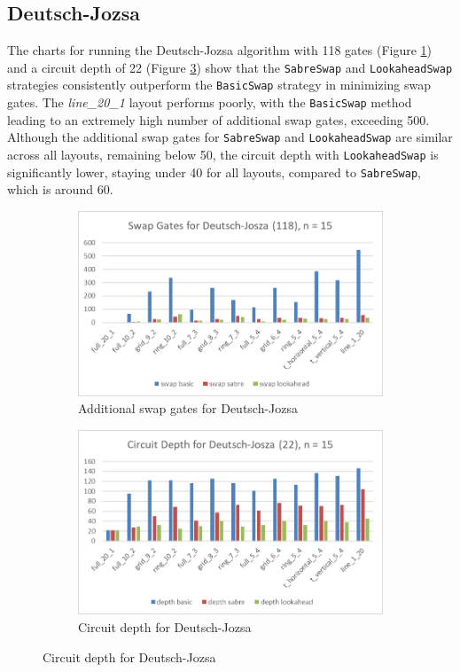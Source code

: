 \subsection{Deutsch-Jozsa} %
The charts for running the Deutsch-Jozsa algorithm with 118 gates (Figure \ref{fig:chart-dj}) and a circuit depth of 22 (Figure \ref{fig:chart-dj-depth}) show that the \lstinline{SabreSwap} and \lstinline{LookaheadSwap} strategies consistently outperform the \lstinline{BasicSwap} strategy in minimizing swap gates. The \textit{line\_20\_1} layout performs poorly, with the \lstinline{BasicSwap} method leading to an extremely high number of additional swap gates, exceeding 500. Although the additional swap gates for \lstinline{SabreSwap} and \lstinline{LookaheadSwap} are similar across all layouts, remaining below 50, the circuit depth with \lstinline{LookaheadSwap} is significantly lower, staying under 40 for all layouts, compared to \lstinline{SabreSwap}, which is around 60.
\begin{figure}[htb]
    \centering
    \begin{subfigure}{0.48\linewidth}
        \includegraphics[width=\linewidth]{image/chart_dj.png}
        \caption{Additional swap gates for Deutsch-Jozsa}
        \label{fig:chart-dj}
    \end{subfigure}
    \begin{subfigure}{0.48\linewidth}
        \includegraphics[width=\linewidth]{image/chart_dj_depth.png}
        \caption{Circuit depth for Deutsch-Jozsa}
        \label{fig:chart-dj-depth}
    \end{subfigure}
\end{figure}

